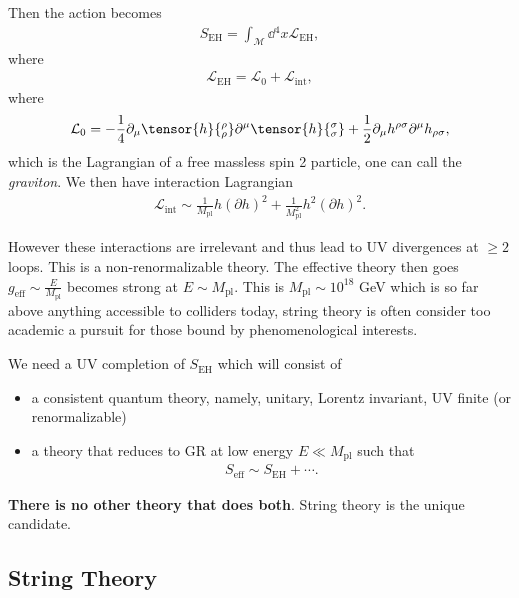 Then the action becomes
\begin{align}
    S_{\text{EH}} = \int_{\mathcal{M}} \dd{^{4}x} \mathcal{L}_{\text{EH}}
,\end{align}
where
\begin{align}
    \mathcal{L}_{\text{EH}} = \mathcal{L}_0 + \mathcal{L}_\text{int}
,\end{align}
where
\begin{align}
    \mathcal{L}_0 = -\frac{1}{4} \partial_\mu \tensor{h}{^{\rho}_{\rho}} \partial^{\mu} \tensor{h}{^{\sigma}_{\sigma}} + \frac{1}{2} \partial_\mu h^{\rho \sigma} \partial^{\mu} h_{\rho \sigma}
,\end{align}
which is the Lagrangian of a free massless spin 2 particle, one can call the \textit{graviton}. We then have interaction Lagrangian
\begin{align}
    \mathcal{L}_\text{int} \sim  \frac{1}{M_\text{pl}} h \left( \partial h \right)^2 + \frac{1}{M_\text{pl}^2} h^2 \left( \partial h \right)^2
.\end{align}

However these interactions are irrelevant and thus lead to UV divergences at $\geq 2$ loops. This is a non-renormalizable theory. The effective theory then goes $g_\text{eff} \sim  \frac{E}{M_\text{pl}}$ becomes strong at $E \sim  M_\text{pl}$. This is $M_\text{pl} \sim  10^{18}$ GeV which is so far above anything accessible to colliders today, string theory is often consider too academic a pursuit for those bound by phenomenological interests.

We need a UV completion of $S_\text{EH}$ which will consist of 
\begin{itemize}
    \item a consistent quantum theory, namely, unitary, Lorentz invariant, UV finite (or renormalizable)
    \item a theory that reduces to GR at low energy $E \ll M_\text{pl}$ such that
        \begin{align}
            S_\text{eff} \sim  S_\text{EH} + \cdots
        .\end{align}
\end{itemize}

\textbf{There is no other theory that does both}. String theory is the unique candidate.

\subsection{String Theory}


